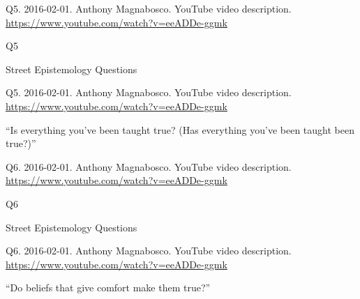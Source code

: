 \documentclass[
    src/templates/5x2-on-a4paper,
    frame
]{flashcards}
\newcommand{\myheader}{}
\newcommand{\myfooter}{
    \begin{flushright}
        \small\sc
        Street Epistemology Questions \par
    \end{flushright}
}
\begin{document}
        \renewcommand{\myheader}{
            \normalfont %
            \begin{tiny}
                Q5.
                2016-02-01.
                Anthony Magnabosco.
                    YouTube video description.
                    \\
                    \url{ https://www.youtube.com/watch?v=eeADDe-ggmk }
                \par
            \end{tiny}
        }
        \begin{flashcard}{
            \myheader
            \vspace{\fill}
            \begin{center}
                \large
                    Q5
            \end{center}
            \vspace{\fill}
            \myfooter
            \vspace{-1.4ex}
        }
            \myheader
            \vspace{\fill}
            \begin{center}
                \large
\enquote{Is everything you've been taught true? (Has everything you've been taught been true?)}            \end{center}
            \vspace{\fill}
        \end{flashcard}
        \renewcommand{\myheader}{
            \normalfont %
            \begin{tiny}
                Q6.
                2016-02-01.
                Anthony Magnabosco.
                    YouTube video description.
                    \\
                    \url{ https://www.youtube.com/watch?v=eeADDe-ggmk }
                \par
            \end{tiny}
        }
        \begin{flashcard}{
            \myheader
            \vspace{\fill}
            \begin{center}
                \large
                    Q6
            \end{center}
            \vspace{\fill}
            \myfooter
            \vspace{-1.4ex}
        }
            \myheader
            \vspace{\fill}
            \begin{center}
                \large
\enquote{Do beliefs that give comfort make them true?}            \end{center}
            \vspace{\fill}
        \end{flashcard}
\end{document}
